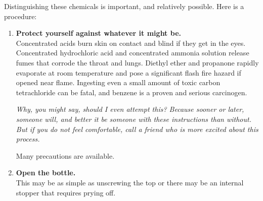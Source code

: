 \noindent Distinguishing these chemicals is important, 
and relatively possible. 
Here is a procedure:
\begin{enumerate}
\item \textbf{Protect yourself against whatever it might be.}\\ 
Concentrated acids burn skin on contact and blind if they get in the eyes. 
Concentrated hydrochloric acid and concentrated ammonia solution 
release fumes that corrode the throat and lungs. 
Diethyl ether and propanone rapidly evaporate at room temperature 
and pose a significant flash fire hazard if opened near flame. 
Ingesting even a small amount of toxic carbon tetrachloride can be fatal, 
and benzene is a proven and serious carcinogen.

\emph{Why, 
you might say, 
should I even attempt this? Because sooner or later, 
someone will, 
and better it be someone with these instructions than without. 
But if you do not feel comfortable, 
call a friend who is more excited about this process.}

Many precautions are available. 

\item \textbf{Open the bottle.}\\
This may be as simple as unscrewing the top 
or there may be an internal stopper that requires prying off. 
\end{enumerate}
